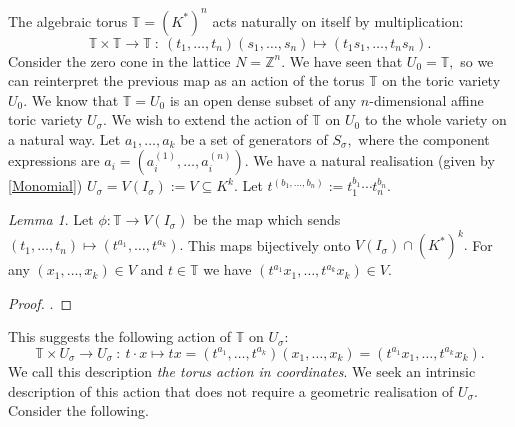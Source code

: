 \documentclass[BSc]{usydthesis}
\numberwithin{equation}{chapter}
\theoremstyle{remark}
\newtheorem{Lemma}[equation]{Lemma}
\newcommand{\Z}{\mathbb{Z}}
\newcommand{\T}{\mathbb{T}}
\begin{document}
The algebraic torus $\T=(K^*)^n$ acts naturally on itself by multiplication: $$ \T \times \T \to \T \ : \ (t_1,\ldots, t_n)(s_1,\ldots, s_n) \mapsto (t_1s_1,\ldots, t_ns_n).$$ Consider the zero cone in the lattice $N=\Z^n.$ We have seen that $U_0= \T,$ so we can reinterpret the previous map as an action of the torus $\T$ on the toric variety $U_0.$ We know that $\T = U_0$ is an open dense subset of any $n$-dimensional affine toric variety $U_{\sigma}.$ We wish to extend the action of $\T$ on $U_0$ to the whole variety on a natural way. Let $a_1,\ldots, a_k$ be a set of generators of $S_{\sigma},$ where the component expressions are $a_i = (a_i^{(1)}, \ldots, a_i^{(n)}).$ We have a natural realisation (given by \ref{Monomial}) $U_{\sigma} = V(I_{\sigma}):=V\subseteq K^k.$ Let $t^{(b_1,\ldots, b_n)}:= t_1^{b_1} \cdots t_n^{b_n}.$

\begin{Lemma}
 Let $\phi: \T \to V(I_{\sigma})$ be the map which sends $(t_1,\ldots, t_n) \mapsto (t^{a_1}, \ldots, t^{a_k}).$ This maps bijectively onto $V(I_{\sigma}) \cap (K^*)^k.$ For any $(x_1,\ldots, x_k)\in V$ and $t\in \T$ we have $(t^{a_1}x_1, \ldots, t^{a_k} x_k ) \in V.$ 
\end{Lemma}

\begin{proof}
 .
\end{proof}

This suggests the following action of $\T$ on $U_{\sigma}:$ $$ \T \times U_{\sigma} \to U_{\sigma} \ : \ t\cdot x \mapsto tx= (t^{a_1}, \ldots, t^{a_k})(x_1,\ldots, x_k) = (t^{a_1} x_1, \ldots, t^{a_k} x_k).$$ We call this description {\em the torus action in coordinates}. We seek an intrinsic description of this action that does not require a geometric realisation of $U_{\sigma}.$ Consider the following.
\end{document}
